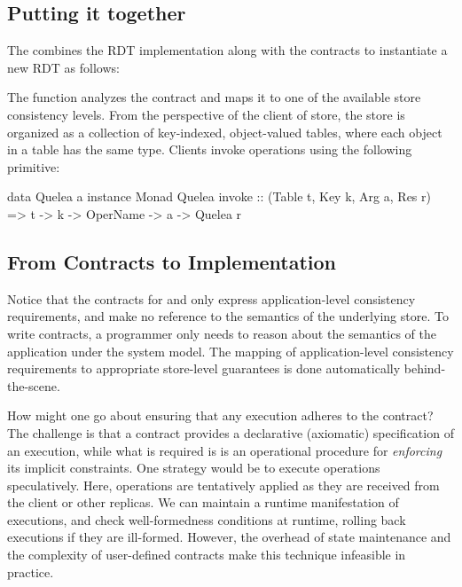 \subsection{Putting it together}

The combines the RDT implementation along with the contracts to instantiate a
new RDT as follows:


\noindent The function  analyzes the contract and maps it to one of the
available store consistency levels. From the perspective of the client of \name
store, the store is organized as a collection of key-indexed, object-valued
tables, where each object in a table has the same type. Clients invoke
operations using the following primitive:

\begin{codehaskell}
data Quelea a
instance Monad Quelea
invoke :: (Table t, Key k, Arg a, Res r)
			 => t -> k -> OperName -> a -> Quelea r
\end{codehaskell}

\subsection{From Contracts to Implementation}

Notice that the contracts for  and  only express
application-level consistency requirements, and make no reference to the
semantics of the underlying store. To write contracts, a programmer only needs
to reason about the semantics of the application under the \name system model.
The mapping of application-level consistency requirements to appropriate
store-level guarantees is done automatically behind-the-scene.

How might one go about ensuring that any execution adheres to the contract? The
challenge is that a contract provides a declarative (axiomatic) specification
of an execution, while what is required is is an operational procedure for
\emph{enforcing} its implicit constraints. One strategy would be to execute
operations speculatively.  Here, operations are tentatively applied as they are
received from the client or other replicas. We can maintain a runtime
manifestation of executions, and check well-formedness conditions at runtime,
rolling back executions if they are ill-formed. However, the overhead of state
maintenance and the complexity of user-defined contracts make this technique
infeasible in practice.

